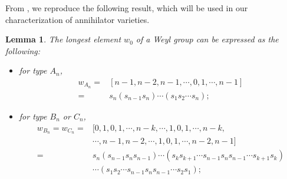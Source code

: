 \documentclass[reqno,12pt]{amsart}
\numberwithin{equation}{section}
\theoremstyle{plain}
\newtheorem{Lem}[Thm]{Lemma}
\theoremstyle{definition}
\newcommand{\aff}{ \mathbf{a} }
\begin{document}



From \cite[Table 1]{BKOP}, we reproduce the following result, which will be used in our characterization of annihilator varieties.

\begin{Lem}\label{long}
    The longest element $w_0$ of a Weyl group can be expressed as the following:
    \begin{itemize}
        \item for type $A_n$,
        \begin{align*}
            w_{A_{n}}=&[n-1,n-2,n-1,\cdots,0,1,\cdots,n-1]\\
            =&s_n(s_{n-1}s_n)\cdots (s_1s_2\cdots s_n);
        \end{align*}
        \item for type $B_n$ or $C_n$,
        \begin{align*}
w_{B_{n}}=w_{C_{n}}=&[0,1,0,1,\cdots,n-k,\cdots,1,0,1,\cdots,n-k,\\
&\cdots,n-1,n-2,\cdots,1,0,1,\cdots,n-2,n-1]\\
=&s_n(s_{n-1}s_ns_{n-1})\cdots (s_ks_{k+1}\cdots s_{n-1} s_ns_{n-1}\cdots s_{k+1}s_k)\\
&\cdots (s_1s_2\cdots s_{n-1} s_ns_{n-1}\cdots s_2s_1);
        \end{align*}
        
       

\end{itemize}
\end{Lem}
\end{document}
